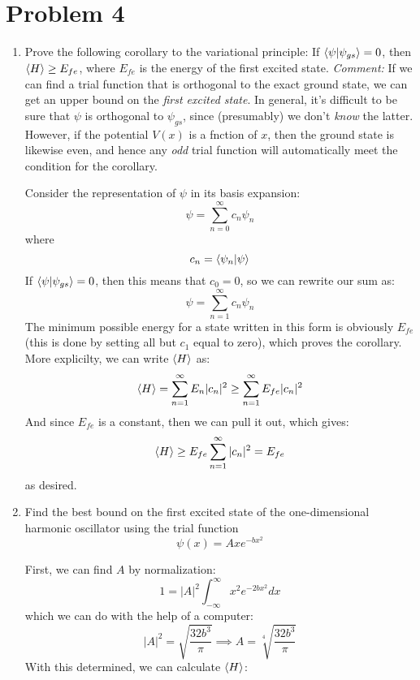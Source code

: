 \documentclass[10pt]{article}
\begin{document}
	\section*{Problem 4}
	\begin{enumerate}[label=(\alph*)]
		\item Prove the following corollary to the variational principle: If $\braket{\psi}{\psi_{gs}} = 0$, then $\langle H \rangle \ge E_{fe}$, where $E_{fe}$ is the energy of the first excited state. \textit{Comment:} If we can find a trial function that is orthogonal to the exact ground state, we can get an upper bound on the \textit{first excited state}. In general, it's difficult to be sure that $\psi$ is orthogonal to $\psi_{gs}$, since (presumably) we don't \textit{know} the latter. However, if the potential $V(x)$ is a fnction of $x$, then the ground state is likewise even, and hence any \textit{odd} trial function will automatically meet the condition for the corollary. 
		
		\begin{solution}
			Consider the representation of $\psi$ in its basis expansion:
			\[ \psi = \sum_{n = 0}^\infty c_n \psi_n\]
			where
			\[ c_n = \braket{\psi_n}{\psi}\]
			If $\braket{\psi}{\psi_{gs}} = 0$, then this means that $c_0 = 0$, so we can rewrite our sum as: 
			\[ \psi = \sum_{n = 1}^\infty c_n \psi_n\]
			The minimum possible energy for a state written in this form is obviously $E_{fe}$ (this is done by setting all but $c_1$ equal to zero), which proves the corollary. More explicilty, we can write $\langle H \rangle$ as: 
			\[ \langle H \rangle = \sum_{n = 1}^\infty E_n |c_n|^2 \ge \sum_{n = 1}^\infty E_{fe} |c_n|^2\]
			And since $E_{fe}$ is a constant, then we can pull it out, which gives: 
			\[ \langle H \rangle \ge E_{fe} \sum_{n = 1}^\infty |c_n|^2 = E_{fe}\] 
			as desired.
		\end{solution}
		\item Find the best bound on the first excited state of the one-dimensional harmonic oscillator using the trial function 
		\[ \psi(x) = Axe^{-bx^2}\]

		\begin{solution}
			First, we can find $A$ by normalization: 
			\[ 1 = |A|^2 \int_{-\infty}^\infty x^2 e^{-2bx^2} dx\]
			which we can do with the help of a computer: 
			\[ |A|^2 = \sqrt{\frac{32 b^3}{\pi}} \implies A = \sqrt[4]{\frac{32 b^3}{\pi}}\]
			With this determined, we can calculate $\langle H \rangle$: 


\end{solution}
\end{enumerate}
\end{document}
